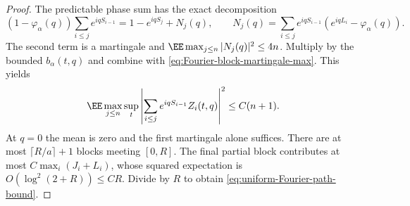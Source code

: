 \documentclass[11pt,letterpaper]{article}
\begin{document}
\begin{proof}
The predictable phase sum has the exact decomposition
\[
 (1-\varphi_\alpha(q))\sum_{i\le j}e^{iqS_{i-1}}
  =1-e^{iqS_j}+N_j(q),\qquad
 N_j(q)=\sum_{i\le j}e^{iqS_{i-1}}
                     (e^{iqL_i}-\varphi_\alpha(q)).
\]
The second term is a martingale and
$\EE\max_{j\le n}|N_j(q)|^2\le4n$.
Multiply by the bounded $b_\alpha(t,q)$ and combine with
\eqref{eq:Fourier-block-martingale-max}. This yields
\[
 \EE\max_{j\le n}\sup_t
       \left|\sum_{i\le j}e^{iqS_{i-1}}Z_i(t,q)\right|^2
                         \le C(n+1).
\]
At $q=0$ the mean is zero and the first martingale alone
suffices. There are at most $\lceil R/a\rceil+1$ blocks
meeting $[0,R]$. The final partial block contributes at most
$C\max_i(J_i+L_i)$, whose squared expectation is
$O(\log^2(2+R))\le CR$. Divide by $R$ to obtain
\eqref{eq:uniform-Fourier-path-bound}.
\end{proof}
\end{document}
